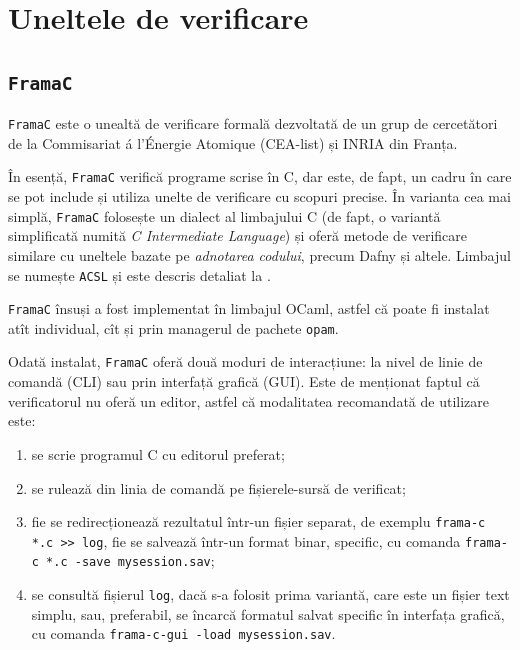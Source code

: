 \chapter{Uneltele de verificare}

\section{\texttt{FramaC}}

\indent\indent \texttt{FramaC} este o unealtă de verificare formală dezvoltată
de un grup de cercetători de la Commisariat \'a l'\'Energie Atomique (CEA-list)
și INRIA din Franța.

În esență, \texttt{FramaC} verifică programe scrise în C, dar este, de fapt,
un cadru în care se pot include și utiliza unelte de verificare cu scopuri precise.
În varianta cea mai simplă, \texttt{FramaC} folosește un dialect al limbajului C
(de fapt, o variantă simplificată numită \emph{C Intermediate Language}) și oferă
metode de verificare similare cu uneltele bazate pe \emph{adnotarea codului},
precum Dafny și altele. Limbajul se numește \texttt{ACSL} și este descris detaliat
la \cite{acsl}.

\texttt{FramaC} însuși a fost implementat în limbajul OCaml, astfel că poate
fi instalat atît individual, cît și prin managerul de pachete \texttt{opam}.

Odată instalat, \texttt{FramaC} oferă două moduri de interacțiune: la nivel
de linie de comandă (CLI) sau prin interfață grafică (GUI). Este de menționat
faptul că verificatorul nu oferă un editor, astfel că modalitatea recomandată
de utilizare este:
\begin{enumerate}[(1)]
\item se scrie programul C cu editorul preferat;
\item se rulează din linia de comandă pe fișierele-sursă
  de verificat;
\item fie se redirecționează rezultatul într-un fișier separat, de exemplu
  \texttt{frama-c *.c >> log}, fie se salvează într-un format binar, specific,
  cu comanda \texttt{frama-c *.c -save mysession.sav};
\item se consultă fișierul \texttt{log}, dacă s-a folosit prima variantă,
  care este un fișier text simplu, sau, preferabil, se încarcă formatul
  salvat specific în interfața grafică, cu comanda \texttt{frama-c-gui -load mysession.sav}.
\end{enumerate}

